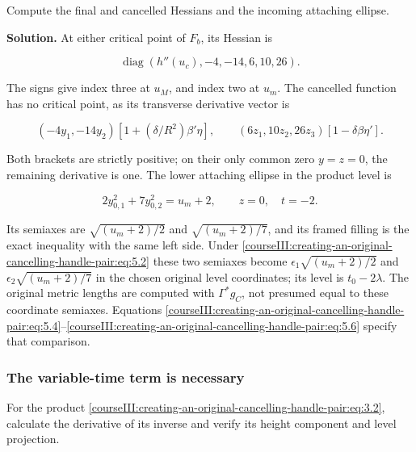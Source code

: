 Compute the final and cancelled Hessians and the incoming attaching ellipse.

\textbf{Solution.} At either critical point of \(F_b\), its Hessian is

\begin{equation}
\operatorname{diag}(h''(u_c),-4,-14,6,10,26).
 \label{courseIII:creating-an-original-cancelling-handle-pair:eq:7.2}
\end{equation}

The signs give index three at \(u_M\), and index two at \(u_m\). The cancelled function has no critical point, as its transverse derivative vector is

\begin{equation}
(-4y_1,-14y_2)
       [1+(\delta/R^2)\beta'\eta],\qquad
 (6z_1,10z_2,26z_3)[1-\delta\beta\eta'].
 \label{courseIII:creating-an-original-cancelling-handle-pair:eq:7.3}
\end{equation}

Both brackets are strictly positive; on their only common zero \(y=z=0\), the remaining derivative is one. The lower attaching ellipse in the product level is

\begin{equation}
2y_{0,1}^2+7y_{0,2}^2=u_m+2,\qquad z=0,\quad t=-2.
 \label{courseIII:creating-an-original-cancelling-handle-pair:eq:7.4}
\end{equation}

Its semiaxes are \(\sqrt{(u_m+2)/2}\) and \(\sqrt{(u_m+2)/7}\), and its framed filling is the exact inequality with the same left side. Under \eqref{courseIII:creating-an-original-cancelling-handle-pair:eq:5.2} these two semiaxes become \(\epsilon_1\sqrt{(u_m+2)/2}\) and \(\epsilon_2\sqrt{(u_m+2)/7}\) in the chosen original level coordinates; its level is \(t_0-2\lambda\). The original metric lengths are computed with \(\Gamma^*g_C\), not presumed equal to these coordinate semiaxes. Equations \eqref{courseIII:creating-an-original-cancelling-handle-pair:eq:5.4}--\eqref{courseIII:creating-an-original-cancelling-handle-pair:eq:5.6} specify that comparison.

\subsubsection{The variable-time term is necessary}
\label{courseIII:creating-an-original-cancelling-handle-pair:section-7.2}

\label{courseIII:pair-creation:7.2}

For the product \eqref{courseIII:creating-an-original-cancelling-handle-pair:eq:3.2}, calculate the derivative of its inverse and verify its height component and level projection.

